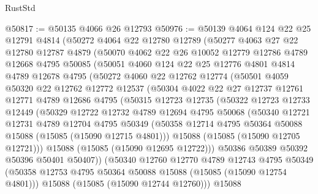 \begin{lexlean}{RustStd}
\begin{coremodule}
@50817 := @50135 @4066 @26 @12793
@50976 := @50139
    @4064
    @124
    @22
    @25
    @12791
    @4814
    (@50272
      @4064
      @22
      @12780
      @12789
      (@50277
        @4063
        @27
        @22
        @12780
        @12787
        @4879
        (@50070
          @4062
          @22
          @26
          @10052
          @12779
          @12786
          @4789
          @12668
          @4795
          @50085
          (@50051
            @4060
            @124
            @22
            @25
            @12776
            @4801
            @4814
            @4789
            @12678
            @4795
            (@50272
              @4060
              @22
              @12762
              @12774
              (@50501
                @4059
                @50320
                @22
                @12762
                @12772
                @12537
                (@50304
                  @4022
                  @22
                  @27
                  @12737
                  @12761
                  @12771
                  @4789
                  @12686
                  @4795
                  (@50315
                    @12723
                    @12735
                    (@50322
                      @12723
                      @12733
                      @12449
                      (@50329
                        @12722
                        @12732
                        @4789
                        @12694
                        @4795
                        @50068
                        (@50340
                          @12721
                          @12731
                          @4789
                          @12704
                          @4795
                          @50349
                          (@50358 @12714 @4795 @50364 @50088 @15088 (@15085 (@15090 @12715 @4801)))
                          @15088
                          (@15085 (@15090 @12705 @12721)))
                        @15088
                        (@15085 (@15090 @12695 @12722)))
                      @50386
                      @50389
                      @50392
                      @50396
                      @50401
                      @50407))
                  (@50340
                    @12760
                    @12770
                    @4789
                    @12743
                    @4795
                    @50349
                    (@50358 @12753 @4795 @50364 @50088 @15088 (@15085 (@15090 @12754 @4801)))
                    @15088
                    (@15085 (@15090 @12744 @12760)))
                  @15088

\end{coremodule}
\end{lexlean}
